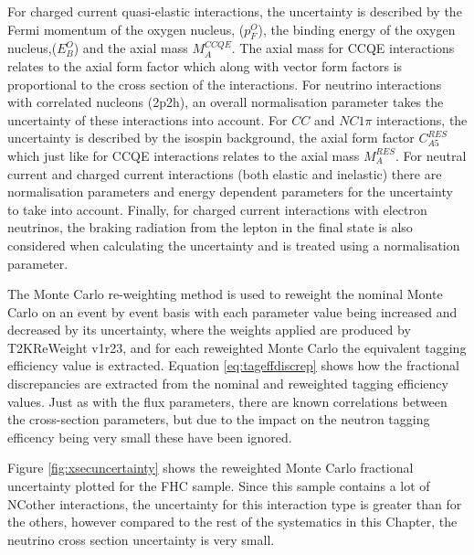 For charged current quasi-elastic interactions, the uncertainty is described by the Fermi momentum of the oxygen nucleus, ($p_{F}^{O}$), the binding energy of the oxygen nucleus,($E_{B}^{O}$) and the axial mass $M_{A}^{C C Q E}$. The axial mass for CCQE interactions relates to the axial form factor which along with vector form factors is proportional to the cross section of the interactions. For neutrino interactions with correlated nucleons (2p2h), an overall normalisation parameter takes the uncertainty of these interactions into account. For $CC$ and $NC1\pi$ interactions, the uncertainty is described by the isospin background, the axial form factor $C_{A 5}^{R E S}$ which just like for CCQE interactions relates to the axial mass $M_{A}^{R E S}$. For neutral current and charged current interactions (both elastic and inelastic) there are normalisation parameters and energy dependent parameters for the uncertainty to take into account. Finally, for charged current interactions with electron neutrinos, the braking radiation from the lepton in the final state is also considered when calculating the uncertainty and is treated using a normalisation parameter.
\newline

The Monte Carlo re-weighting method is used to reweight the nominal Monte Carlo on an event by event basis with each parameter value being increased and decreased by its uncertainty, where the weights applied are produced by T2KReWeight v1r23, and for each reweighted Monte Carlo the equivalent tagging efficiency value is extracted. Equation \ref{eq:tageffdiscrep} shows how the fractional discrepancies are extracted from the nominal and reweighted tagging efficiency values. Just as with the flux parameters, there are known correlations between the cross-section parameters, but due to the impact on the neutron tagging efficency being very small these have been ignored. 

Figure \ref{fig:xsecuncertainty} shows the reweighted Monte Carlo fractional uncertainty plotted for the FHC sample. Since this sample contains a lot of NCother interactions, the uncertainty for this interaction type is greater than for the others, however compared to the rest of the systematics in this Chapter, the neutrino cross section uncertainty is very small.


